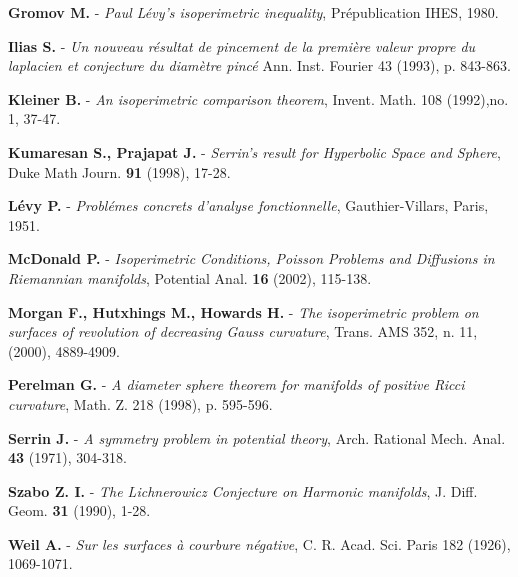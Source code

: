 \documentclass[11pt, reqno]{amsart}
\theoremstyle{plain}
\begin{document}
\begin{thebibliography}{10}
 \textbf{Gromov M.} - \textit{Paul L\'{e}vy's isoperimetric inequality}, Pr\'{e}publication IHES,
1980.

 \textbf{Ilias S.} - \textit{Un nouveau r\'{e}sultat de pincement de la premi\`ere valeur propre du laplacien et conjecture du diam\`etre pinc\'{e}}
 Ann. Inst. Fourier 43 (1993), p. 843-863.

 \textbf{Kleiner B.} - \textit{An isoperimetric comparison theorem},
 Invent. Math. 108 (1992),no. 1, 37-47.

 \textbf{Kumaresan S., Prajapat J.} - 
\textit{Serrin's result for Hyperbolic Space and Sphere}, Duke Math Journ. {\bf 91} (1998), 17-28.

 \textbf{L\'{e}vy P.} - \textit{Probl\'{e}mes concrets d'analyse fonctionnelle}, 
Gauthier-Villars, Paris, 1951.

 \textbf{McDonald P.} - 
\textit{Isoperimetric Conditions, Poisson Problems and Diffusions in Riemannian
manifolds}, Potential Anal. {\bf 16} (2002), 115-138.

 \textbf{Morgan F., Hutxhings M., Howards H.} - 
\textit{The isoperimetric problem on surfaces of revolution of decreasing Gauss curvature},
Trans. AMS   352, n. 11,  (2000), 4889-4909.

 \textbf{Perelman G.} - \textit{ A diameter sphere theorem for manifolds of positive Ricci curvature},
Math. Z. 218 (1998), p. 595-596.

 \textbf{Serrin J.} - \textit{A symmetry problem in potential theory}, Arch. Rational
Mech. Anal. {\bf 43} (1971), 304-318.

 \textbf{Szabo Z. I.} - \textit{The Lichnerowicz Conjecture on 
Harmonic manifolds}, J. Diff. Geom. {\bf 31} (1990), 1-28.

 \textbf{Weil A.} - \textit{Sur les surfaces \`a courbure n\'egative}, 
C. R. Acad. Sci. Paris 182 (1926), 1069-1071.

\end{thebibliography}
\end{document}
